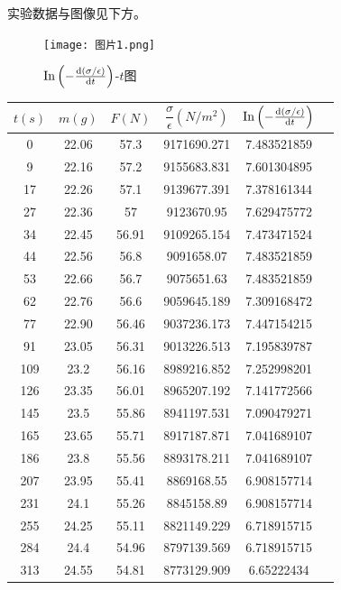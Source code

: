\documentclass[ctex]{article}
\begin{document}
实验数据与图像见下方。
\begin{figure}[htbp]
    \centering
    \texttt{[image: 图片1.png]}
    \caption{$\mathrm{In}\left(-\dv{(\sigma/\epsilon)}{t}\right)$-$t$图}
\end{figure} 
\begin{table}[H]
    \centering
    \begin{tabular}{|c|c| c|c |c |c|}
\hline
$t(s)$ &$m(g)$&$F(N)$&$\dfrac{\sigma}{\epsilon}(N/m^2)$&$\mathrm{In}\left(-\dv{(\sigma/\epsilon)}{t}\right)$\\
\hline
 0 & 22.06 & 57.3 & 9171690.271 & 7.483521859 \\ \hline
        9 & 22.16 & 57.2 & 9155683.831 & 7.601304895 \\ \hline
        17 & 22.26 & 57.1 & 9139677.391 & 7.378161344 \\ \hline
        27 & 22.36 & 57 & 9123670.95 & 7.629475772 \\ \hline
        34 & 22.45 & 56.91 & 9109265.154 & 7.473471524 \\ \hline
        44 & 22.56 & 56.8 & 9091658.07 & 7.483521859 \\ \hline
        53 & 22.66 & 56.7 & 9075651.63 & 7.483521859 \\ \hline
        62 & 22.76 & 56.6 & 9059645.189 & 7.309168472 \\ \hline
        77 & 22.90  & 56.46 & 9037236.173 & 7.447154215 \\ \hline
        91 & 23.05 & 56.31 & 9013226.513 & 7.195839787 \\ \hline
        109 & 23.2 & 56.16 & 8989216.852 & 7.252998201 \\ \hline
        126 & 23.35 & 56.01 & 8965207.192 & 7.141772566 \\ \hline
        145 & 23.5 & 55.86 & 8941197.531 & 7.090479271 \\ \hline
        165 & 23.65 & 55.71 & 8917187.871 & 7.041689107 \\ \hline
        186 & 23.8 & 55.56 & 8893178.211 & 7.041689107 \\ \hline
        207 & 23.95 & 55.41 & 8869168.55 & 6.908157714 \\ \hline
        231 & 24.1 & 55.26 & 8845158.89 & 6.908157714 \\ \hline
        255 & 24.25 & 55.11 & 8821149.229 & 6.718915715 \\ \hline
        284 & 24.4 & 54.96 & 8797139.569 & 6.718915715 \\ \hline
        313 & 24.55 & 54.81 & 8773129.909 & 6.65222434 \\ \hline

\end{tabular}
\end{table}
\end{document}
